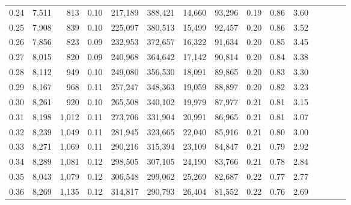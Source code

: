 \begin{tabular}{rrrcrrrrrrrrrrr}
0.24 &   7,511 &     813 &                                       0.10 &  217,189 &  388,421 &   14,660 &   93,296 &  0.19 &  0.86 &                         3.60 \\
0.25 &   7,908 &     839 &                                       0.10 &  225,097 &  380,513 &   15,499 &   92,457 &  0.20 &  0.86 &                         3.52 \\
0.26 &   7,856 &     823 &                                       0.09 &  232,953 &  372,657 &   16,322 &   91,634 &  0.20 &  0.85 &                         3.45 \\
0.27 &   8,015 &     820 &                                       0.09 &  240,968 &  364,642 &   17,142 &   90,814 &  0.20 &  0.84 &                         3.38 \\
0.28 &   8,112 &     949 &                                       0.10 &  249,080 &  356,530 &   18,091 &   89,865 &  0.20 &  0.83 &                         3.30 \\
0.29 &   8,167 &     968 &                                       0.11 &  257,247 &  348,363 &   19,059 &   88,897 &  0.20 &  0.82 &                         3.23 \\
0.30 &   8,261 &     920 &                                       0.10 &  265,508 &  340,102 &   19,979 &   87,977 &  0.21 &  0.81 &                         3.15 \\
0.31 &   8,198 &   1,012 &                                       0.11 &  273,706 &  331,904 &   20,991 &   86,965 &  0.21 &  0.81 &                         3.07 \\
0.32 &   8,239 &   1,049 &                                       0.11 &  281,945 &  323,665 &   22,040 &   85,916 &  0.21 &  0.80 &                         3.00 \\
0.33 &   8,271 &   1,069 &                                       0.11 &  290,216 &  315,394 &   23,109 &   84,847 &  0.21 &  0.79 &                         2.92 \\
0.34 &   8,289 &   1,081 &                                       0.12 &  298,505 &  307,105 &   24,190 &   83,766 &  0.21 &  0.78 &                         2.84 \\
0.35 &   8,043 &   1,079 &                                       0.12 &  306,548 &  299,062 &   25,269 &   82,687 &  0.22 &  0.77 &                         2.77 \\
0.36 &   8,269 &   1,135 &                                       0.12 &  314,817 &  290,793 &   26,404 &   81,552 &  0.22 &  0.76 &                         2.69 \\

\end{tabular}
